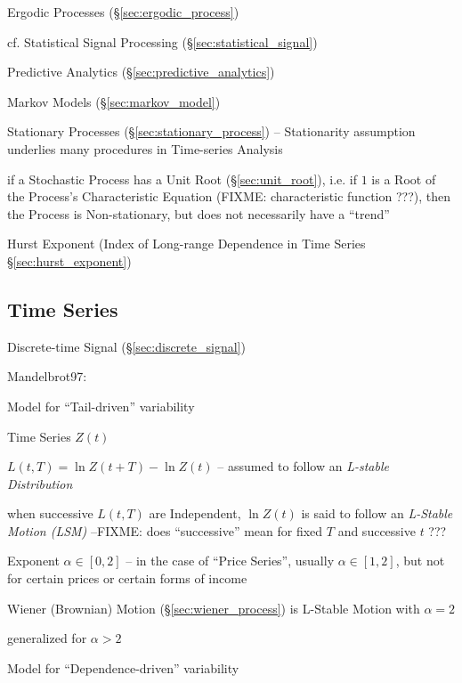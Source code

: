 Ergodic Processes (\S\ref{sec:ergodic_process})

\fist cf. Statistical Signal Processing (\S\ref{sec:statistical_signal})

Predictive Analytics (\S\ref{sec:predictive_analytics})

\fist Markov Models (\S\ref{sec:markov_model})

Stationary Processes (\S\ref{sec:stationary_process}) -- Stationarity assumption
underlies many procedures in Time-series Analysis

if a Stochastic Process has a Unit Root (\S\ref{sec:unit_root}), i.e. if $1$ is
a Root of the Process's Characteristic Equation (FIXME: characteristic function
???), then the Process is Non-stationary, but does not necessarily have a
``trend''

Hurst Exponent (Index of Long-range Dependence in Time Series
\S\ref{sec:hurst_exponent})



\subsection{Time Series}\label{sec:time_series}

Discrete-time Signal (\S\ref{sec:discrete_signal})

Mandelbrot97:


Model for ``Tail-driven'' variability

Time Series $Z(t)$

$L(t, T) = \ln Z(t+T) - \ln Z(t)$ -- assumed to follow an \emph{L-stable
  Distribution}

when successive $L(t, T)$ are Independent, $\ln Z(t)$ is said to follow an
\emph{L-Stable Motion (LSM)} --FIXME: does ``successive'' mean for fixed $T$ and
successive $t$ ???

Exponent $\alpha \in [0, 2]$ -- in the case of ``Price Series'', usually
$\alpha \in [1, 2]$, but not for certain prices or certain forms of income

Wiener (Brownian) Motion (\S\ref{sec:wiener_process}) is L-Stable Motion with
$\alpha = 2$

generalized for $\alpha > 2$

Model for ``Dependence-driven'' variability



